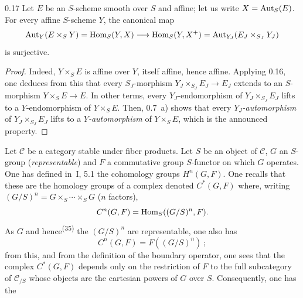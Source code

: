\begin{corollary}{0.17}\label{III.0.17}
Let \(E\) be an \(S\)-scheme smooth over \(S\) and affine; let us write
\(X=\operatorname{Aut}_{S}(E)\). For every affine \(S\)-scheme \(Y\), the canonical map
\[
\operatorname{Aut}_{Y}(E\times_{S}Y)
  =\operatorname{Hom}_{S}(Y, X)
  \longrightarrow
  \operatorname{Hom}_{S}(Y, X^{+})
  =\operatorname{Aut}_{Y_{J}}(E_{J}\times_{S_{J}}Y_{J})
\]
is surjective.
\end{corollary}

\begin{proof}
Indeed, \(Y\times_{S}E\) is affine over \(Y\), itself affine, hence affine.
Applying 0.16, one deduces from this that every \(S_{J}\)-morphism
\(Y_{J}\times_{S_{J}}E_{J}\to E_{J}\) extends to an \(S\)-morphism
\(Y\times_{S}E\to E\).
{\renewcommand{\thefootnote}{(34)}}
In other terms, every \(Y_{J}\)-endomorphism of
\(Y_{J}\times_{S_{J}}E_{J}\) lifts to a \(Y\)-endomorphism of
\(Y\times_{S}E\). Then, 0.7~a) shows that every
\emph{\(Y_{J}\)-automorphism} of \(Y_{J}\times_{S_{J}}E_{J}\) lifts to a
\emph{\(Y\)-automorphism} of \(Y\times_{S}E\), which is the announced
property.
\end{proof}

\label{III.sec.1}

Let \(\mathcal{C}\) be a category stable under fiber
products.%
{\renewcommand{\thefootnote}{(35)}}
Let \(S\) be an object of \(\mathcal{C}\), \(G\) an \(S\)-group
(\emph{representable}) and \(F\) a commutative group \(S\)-functor on which
\(G\) operates. One has defined in~I, 5.1 the cohomology groups
\(H^{n}(G, F)\). One recalls that these are the homology groups of a complex
denoted \(C^{*}(G, F)\) where, writing
\((G/S)^{n}=G\times_{S}\cdots\times_{S}G\) (\(n\) factors),
\[
C^{n}(G, F)=\operatorname{Hom}_{S}((G/S)^{n}, F).
\]
As \(G\) and hence\textsuperscript{(35)} the \((G/S)^{n}\) are representable,
one also has
\[
C^{n}(G, F)=F((G/S)^{n})\,;
\]
from this, and from the definition of the boundary operator, one sees that
the complex \(C^{*}(G, F)\) depends only on the restriction of \(F\) to the
full subcategory of \(\mathcal{C}_{/S}\) whose objects are the cartesian
powers of \(G\) over \(S\). Consequently, one has the

